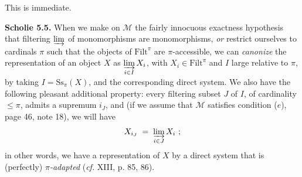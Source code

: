 \documentclass[11pt]{article}
\newcommand{\msp}[1]{\marginpar{\footnotesize [#1]}}
\newcommand{\cM}{\mathcal{M}}
\newcommand{\Filt}{\mathrm{Filt}}
\newcommand{\Ss}{\mathrm{Ss}}
\begin{document}
This is immediate.

\msp{page 49}
\textbf{Scholie 5.5.} When we make on $\cM$ the fairly innocuous exactness hypothesis that filtering $\varinjlim$ of monomorphisms are monomorphisms, \textit{or} restrict ourselves to cardinals $\pi$ such that the objects of $\Filt^{\pi}$ are $\pi$-accessible, we can \textit{canonize} the representation of an object $X$ as $\varinjlim\limits_{i\in I} X_i$, with $X_i \in \Filt^{\pi}$ and $I$ large relative to $\pi$, by taking $I = \Ss_{\pi}(X)$, and the corresponding direct system. We also have the following pleasant additional property: every filtering subset $J$ of $I$, of cardinality $\leq \pi$, admits a supremum $i_J$, and (if we assume that $\cM$ satisfies condition ($e$), page 46, note 18), we will have
\[
X_{i_J} \;=\; \varinjlim_{i\in J} X_i \ ;
\]
in other words, we have a representation of $X$ by a direct system that is (perfectly) \textit{$\pi$-adapted} (\textit{cf.} XIII, p. 85, 86).
\end{document}
